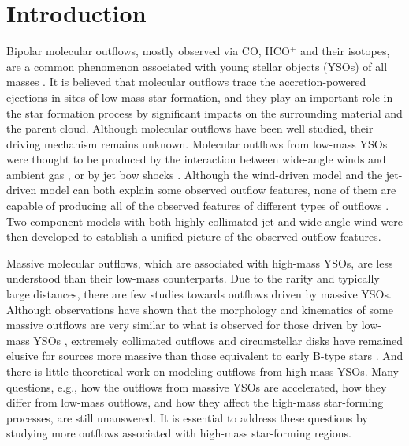 \section{Introduction}
Bipolar molecular outflows, mostly observed via CO, HCO$^+$ and their isotopes, are a common phenomenon associated with young stellar objects (YSOs) of all masses \citep{2001ApJ...552L.167Z, 2002A&A...383..892B, 2004A&A...426..503W, 2005AJ....129..330W,  2015MNRAS.453..645M}. It is believed that molecular outflows trace the accretion-powered ejections in sites of low-mass star formation, and they play an important role in the star formation process by significant impacts on the surrounding material and the parent cloud. Although molecular outflows have been well studied, their driving mechanism remains unknown. Molecular outflows from low-mass YSOs were thought to be produced by the interaction between wide-angle winds and ambient gas \citep{1991ApJ...370L..31S, 2001ApJ...557..429L}, or by jet bow shocks \citep{1993A&A...278..267R, 1993ApJ...414..230M, 2001ApJ...557..429L}. Although the wind-driven model and the jet-driven model can both explain some observed outflow features, none of them are capable of producing all of the observed features of different types of outflows \citep{2000ApJ...542..925L, 2002ApJ...576..294L}. Two-component models with both highly collimated jet and wide-angle wind were then developed to establish a unified picture of the observed outflow features\citep{2000prpl.conf..789S, 2006ApJ...641..949B, 2006MNRAS.365.1131P, 2006ApJ...649..845S, 2007prpl.conf..277P, 2008ApJ...676.1088M}.

Massive molecular outflows, which are associated with high-mass YSOs, are less understood than their low-mass counterparts. Due to the rarity and typically large distances, there are few studies towards outflows driven by massive YSOs. Although observations have shown that the morphology and kinematics of some massive outflows are very similar to what is observed for those driven by low-mass YSOs \citep[][]{1998ApJ...507..861S, 2002A&A...387..931B, 2009ApJ...696...66Q, 2011MNRAS.415L..49R}, extremely collimated outflows and circumstellar disks have remained elusive for sources more massive than those equivalent to early B-type stars \citep{2007prpl.conf..245A}. And there is little theoretical work on modeling outflows from high-mass YSOs. Many questions, e.g., how the outflows from massive YSOs are accelerated, how they differ from low-mass outflows, and how they affect the high-mass star-forming processes, are still unanswered. It is essential to address these questions by studying more outflows associated with high-mass star-forming regions. 

